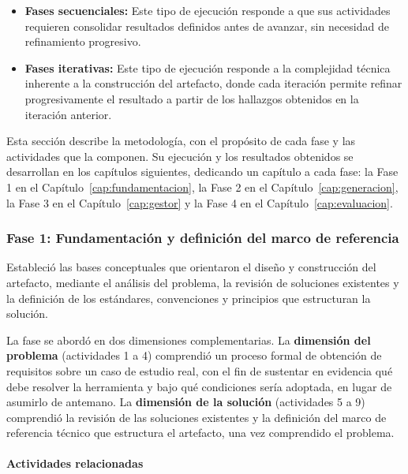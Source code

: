 \begin{itemize}
  \item \textbf{Fases secuenciales:} Este tipo de ejecución responde a que sus actividades requieren consolidar resultados definidos antes de avanzar, sin necesidad de refinamiento progresivo.

  \item \textbf{Fases iterativas:} Este tipo de ejecución responde a la complejidad técnica inherente a la construcción del artefacto, donde cada iteración permite refinar progresivamente el resultado a partir de los hallazgos obtenidos en la iteración anterior.
\end{itemize}

Esta sección describe la metodología, con el propósito de cada fase y
las actividades que la componen. Su ejecución y los resultados obtenidos
se desarrollan en los capítulos siguientes, dedicando un capítulo a cada
fase: la Fase 1 en el Capítulo~\ref{cap:fundamentacion}, la Fase 2 en el
Capítulo~\ref{cap:generacion}, la Fase 3 en el Capítulo~\ref{cap:gestor}
y la Fase 4 en el Capítulo~\ref{cap:evaluacion}.

\subsubsection*{Fase 1: Fundamentación y definición del marco de referencia}

Estableció las bases conceptuales que orientaron el diseño y construcción del artefacto, mediante el análisis del problema, la revisión de soluciones existentes y la definición de los estándares, convenciones y principios que estructuran la solución.

La fase se abordó en dos dimensiones complementarias. La \textbf{dimensión del problema} (actividades 1 a 4) comprendió un proceso formal de obtención de requisitos sobre un caso de estudio real, con el fin de sustentar en evidencia qué debe resolver la herramienta y bajo qué condiciones sería adoptada, en lugar de asumirlo de antemano. La \textbf{dimensión de la solución} (actividades 5 a 9) comprendió la revisión de las soluciones existentes y la definición del marco de referencia técnico que estructura el artefacto, una vez comprendido el problema.

\paragraph*{Actividades relacionadas}

